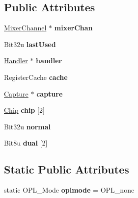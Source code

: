 \subsection*{Public Attributes}
\begin{DoxyCompactItemize}
\item 
\hypertarget{classAdlib_1_1Module_ab2735ec71d71c2fed106414a28e7b3dd}{\hyperlink{classMixerChannel}{Mixer\-Channel} $\ast$ {\bfseries mixer\-Chan}}\label{classAdlib_1_1Module_ab2735ec71d71c2fed106414a28e7b3dd}

\item 
\hypertarget{classAdlib_1_1Module_aa64bb4f4e8df792923ec600adab23e95}{Bit32u {\bfseries last\-Used}}\label{classAdlib_1_1Module_aa64bb4f4e8df792923ec600adab23e95}

\item 
\hypertarget{classAdlib_1_1Module_a98fd9c9fc228158d14470aba74c11d3d}{\hyperlink{classAdlib_1_1Handler}{Handler} $\ast$ {\bfseries handler}}\label{classAdlib_1_1Module_a98fd9c9fc228158d14470aba74c11d3d}

\item 
\hypertarget{classAdlib_1_1Module_a6ff7a7de674ccd20e3cba84c24cb34bb}{Register\-Cache {\bfseries cache}}\label{classAdlib_1_1Module_a6ff7a7de674ccd20e3cba84c24cb34bb}

\item 
\hypertarget{classAdlib_1_1Module_a3c27ce4b0419c604ef9aa97f6284ab2e}{\hyperlink{classAdlib_1_1Capture}{Capture} $\ast$ {\bfseries capture}}\label{classAdlib_1_1Module_a3c27ce4b0419c604ef9aa97f6284ab2e}

\item 
\hypertarget{classAdlib_1_1Module_a8ab68b7993489a693b615103690e0c42}{\hyperlink{structAdlib_1_1Chip}{Chip} {\bfseries chip} \mbox{[}2\mbox{]}}\label{classAdlib_1_1Module_a8ab68b7993489a693b615103690e0c42}

\item 
\hypertarget{classAdlib_1_1Module_a638786de2224cff8d9fa5645d2b56e5d}{Bit32u {\bfseries normal}}\label{classAdlib_1_1Module_a638786de2224cff8d9fa5645d2b56e5d}

\item 
\hypertarget{classAdlib_1_1Module_a6b785b34bef809064f0a2574cfa4228a}{Bit8u {\bfseries dual} \mbox{[}2\mbox{]}}\label{classAdlib_1_1Module_a6b785b34bef809064f0a2574cfa4228a}

\end{DoxyCompactItemize}
\subsection*{Static Public Attributes}
\begin{DoxyCompactItemize}
\item 
\hypertarget{classAdlib_1_1Module_a4b15a75a7fed20aa923ee1ad44a0e6c2}{static O\-P\-L\-\_\-\-Mode {\bfseries oplmode} = O\-P\-L\-\_\-none}\label{classAdlib_1_1Module_a4b15a75a7fed20aa923ee1ad44a0e6c2}

\end{DoxyCompactItemize}


